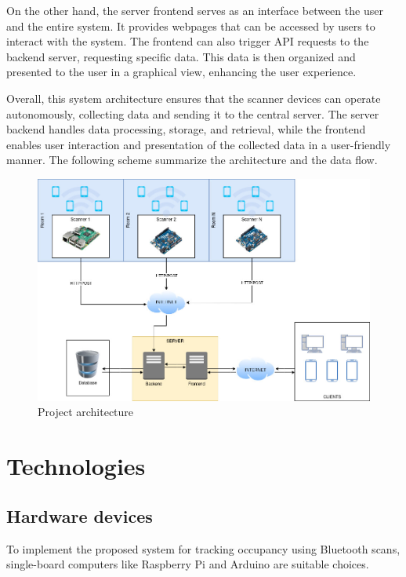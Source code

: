 \documentclass[a4paper, 11pt]{article}
\begin{document}
On the other hand, the server frontend serves as an interface between the user and the entire system. It provides webpages that can be accessed by users to interact with the system. The frontend can also trigger API requests to the backend server, requesting specific data. This data is then organized and presented to the user in a graphical view, enhancing the user experience.

Overall, this system architecture ensures that the scanner devices can operate autonomously, collecting data and sending it to the central server. The server backend handles data processing, storage, and retrieval, while the frontend enables user interaction and presentation of the collected data in a user-friendly manner. The following scheme summarize the architecture and the data flow.

\begin{figure}
    \centering
    \includegraphics[width=1\linewidth]{images/WNMA-ProjectScheme.jpg}
    \caption{Project architecture}
    \label{fig:enter-label}
\end{figure}



\newpage
\section{Technologies}
\subsection{Hardware devices}
To implement the proposed system for tracking occupancy using Bluetooth scans, single-board computers like Raspberry Pi \cite{RPI} and Arduino \cite{arduino} are suitable choices. 
\end{document}
